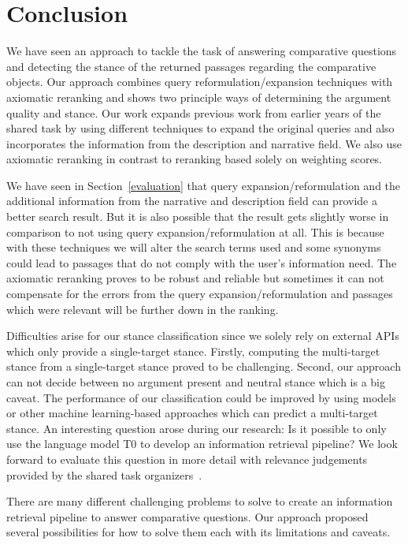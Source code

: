 \section{Conclusion}

We have seen an approach to tackle the task of answering comparative questions and detecting the stance of the returned passages regarding the comparative objects.
Our approach combines query reformulation/expansion techniques with axiomatic reranking and shows two principle ways of determining the argument quality and stance.
Our work expands previous work from earlier years of the shared task by using different techniques to expand the original queries and also incorporates the information from the description and narrative field.
We also use axiomatic reranking in contrast to reranking based solely on weighting scores.

We have seen in Section~\ref{evaluation} that query expansion/reformulation and the additional information from the narrative and description field can provide a better search result.
But it is also possible that the result gets slightly worse in comparison to not using query expansion/reformulation at all.
This is because with these techniques we will alter the search terms used and some synonyms could lead to passages that do not comply with the user's information need.
The axiomatic reranking proves to be robust and reliable but sometimes it can not compensate for the errors from the query expansion/reformulation and passages which were relevant will be further down in the ranking.

Difficulties arise for our stance classification since we solely rely on external APIs which only provide a single-target stance.
Firstly, computing the multi-target stance from a single-target stance proved to be challenging.
Second, our approach can not decide between no argument present and neutral stance which is a big caveat.
The performance of our classification could be improved by using \Bert models or other machine learning-based approaches which can predict a multi-target stance.
An interesting question arose during our research:
Is it possible to only use the language model T0 to develop an information retrieval pipeline?
We look forward to evaluate this question in more detail with relevance judgements provided by the shared task organizers~\cite{BondarenkoFKSGBPBSWPH2022}.

There are many different challenging problems to solve to create an information retrieval pipeline to answer comparative questions.
Our approach proposed several possibilities for how to solve them each with its limitations and caveats.

